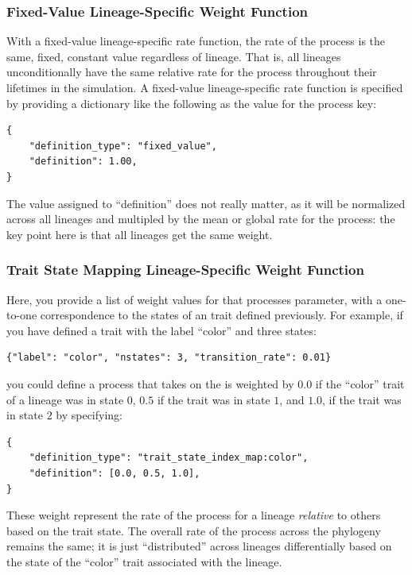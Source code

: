 \documentclass[11pt,openany]{memoir} %
\begin{document}
\subsubsection{Fixed-Value Lineage-Specific Weight Function}
With a fixed-value lineage-specific rate function, the rate of the process is the same, fixed, constant value regardless of lineage.
That is, all lineages unconditionally have the same relative rate for the process throughout their lifetimes in the simulation.
A fixed-value lineage-specific rate function is specified by providing a dictionary like the following as the value for the process key:
\begin{lstlisting}
{
    "definition_type": "fixed_value",
    "definition": 1.00,
}
\end{lstlisting}
The value assigned to ``definition'' does not really matter, as it will be normalized across all lineages and multipled by the mean or global rate for the process: the key point here is that all lineages get the same weight.

\subsubsection{Trait State Mapping Lineage-Specific Weight Function}
\label{sec:trait-state-mapping}
Here, you provide a list of weight values for that processes parameter, with a one-to-one correspondence to the states of an trait defined previously.
For example, if you have defined a trait with the label ``color'' and three states:
\begin{lstlisting}
{"label": "color", "nstates": 3, "transition_rate": 0.01}
\end{lstlisting}
you could define a process that takes on the is weighted by $0.0$ if the ``color'' trait of a lineage was in state $0$, $0.5$ if the trait was in state $1$, and $1.0$, if the trait was in state $2$ by specifying:
\begin{lstlisting}
{
    "definition_type": "trait_state_index_map:color",
    "definition": [0.0, 0.5, 1.0],
}
\end{lstlisting}
These weight represent the rate of the process for a lineage \textit{relative} to others based on the trait state.
The overall rate of the process across the phylogeny remains the same; it is just ``distributed'' across lineages differentially based on the state of the ``color'' trait associated with the lineage.
\end{document}
